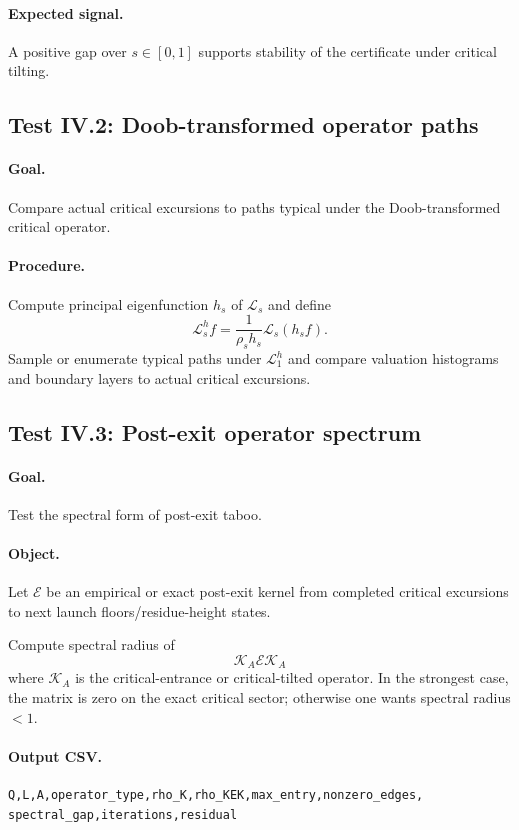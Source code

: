 \documentclass[11pt]{article}
\begin{document}
\paragraph{Expected signal.}
A positive gap over $s\in[0,1]$ supports stability of the certificate under critical tilting.

\subsection{Test IV.2: Doob-transformed operator paths}

\paragraph{Goal.} Compare actual critical excursions to paths typical under the Doob-transformed critical operator.

\paragraph{Procedure.}
Compute principal eigenfunction $h_s$ of $\mathcal L_s$ and define
\[
  \mathcal L_s^h f=\frac{1}{\rho_s h_s}\mathcal L_s(h_sf).
\]
Sample or enumerate typical paths under $\mathcal L_1^h$ and compare valuation histograms and boundary layers to actual critical excursions.

\subsection{Test IV.3: Post-exit operator spectrum}

\paragraph{Goal.} Test the spectral form of post-exit taboo.

\paragraph{Object.} Let $\mathcal E$ be an empirical or exact post-exit kernel from completed critical excursions to next launch floors/residue-height states.

Compute spectral radius of
\[
  \mathcal K_A\mathcal E\mathcal K_A
\]
where $\mathcal K_A$ is the critical-entrance or critical-tilted operator. In the strongest case, the matrix is zero on the exact critical sector; otherwise one wants spectral radius $<1$.

\paragraph{Output CSV.}
\begin{verbatim}
Q,L,A,operator_type,rho_K,rho_KEK,max_entry,nonzero_edges,
spectral_gap,iterations,residual
\end{verbatim}
\end{document}
